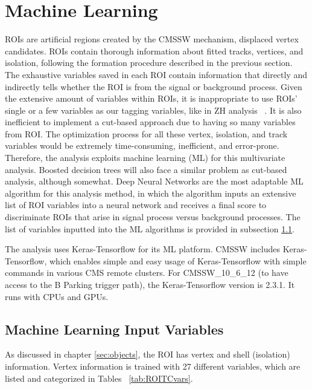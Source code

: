 \clearpage
\chapter{Machine Learning}\label{sec:machinelearning}
ROIs are artificial regions created by the CMSSW mechanism, displaced vertex candidates.
ROIs contain thorough information about fitted tracks, vertices, and isolation, following the formation procedure described in the previous section.
The exhaustive variables saved in each ROI contain information that directly and indirectly tells whether the ROI is from the signal or background process.
Given the extensive amount of variables within ROIs, it is inappropriate to use ROIs' single or a few variables as our tagging variables, like in ZH analysis ~\cite{ZHAN}.
It is also inefficient to implement a cut-based approach due to having so many variables from ROI.
The optimization process for all these vertex, isolation, and track variables would be extremely time-consuming, inefficient, and error-prone.
Therefore, the analysis exploits machine learning (ML) for this multivariate analysis.
Boosted decision trees will also face a similar problem as cut-based analysis, although somewhat.
Deep Neural Networks are the most adaptable ML algorithm for this analysis method, in which the algorithm inputs an extensive list of ROI variables into a neural network and receives a final score to discriminate ROIs that arise in signal process versus background processes.
The list of variables inputted into the ML algorithms is provided in subsection \ref{sec:MLIV}.

The analysis uses Keras-Tensorflow for its ML platform.
CMSSW includes Keras-Tensorflow, which enables simple and easy usage of Keras-Tensorflow with simple commands in various CMS remote clusters.
For CMSSW\_10\_6\_12 (to have access to the B Parking trigger path), the Keras-Tensorflow version is 2.3.1.
It runs with CPUs and GPUs.
\section{Machine Learning Input Variables}\label{sec:MLIV}
As discussed in chapter \ref{sec:objects}, the ROI has vertex and shell (isolation) information.
Vertex information is trained with 27 different variables, which are listed and categorized in Tables ~\ref{tab:ROITCvars}.

